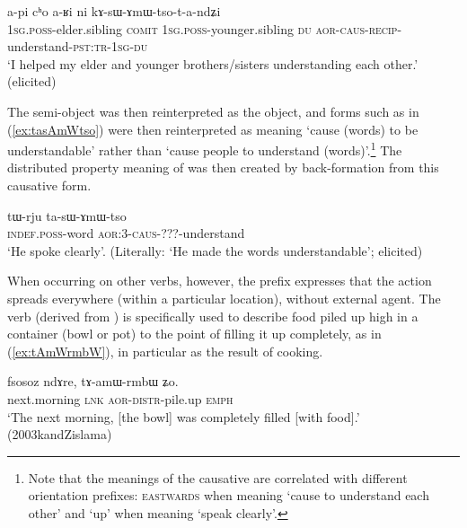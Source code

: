 \begin{exe}
\ex \label{ex:kAsAmWtsotandZi}
 \gll a-pi cʰo a-ʁi ni kɤ-sɯ-ɤmɯ-tso-t-a-ndʑi  \\
\textsc{1sg}.\textsc{poss}-elder.sibling \textsc{comit} \textsc{1sg}.\textsc{poss}-younger.sibling \textsc{du} \textsc{aor}-\textsc{caus}-\textsc{recip}-understand-\textsc{pst}:\textsc{tr}-\textsc{1sg}-\textsc{du} \\
\glt `I helped my elder and younger brothers/sisters understanding each other.' (elicited)
\end{exe}

The semi-object was then reinterpreted as the object, and forms such as  in (\ref{ex:tasAmWtso}) were then reinterpreted as meaning `cause (words) to be understandable' rather than `cause people to understand (words)'.\footnote{Note that the meanings of the causative  are correlated with different orientation prefixes: \textsc{eastwards} when meaning `cause to understand each other' and `up' when meaning `speak clearly'. } The distributed property meaning of  was then created by back-formation from this causative form.

\begin{exe}
\ex \label{ex:tasAmWtso}
 \gll tɯ-rju ta-sɯ-ɤmɯ-tso \\
 \textsc{indef}.\textsc{poss}-word \textsc{aor}:3\flobv{}-\textsc{caus}-???-understand \\
 \glt `He spoke clearly'. (Literally: `He made the words understandable'; elicited)
 \end{exe}

When occurring on other verbs, however, the  prefix expresses that the action spreads everywhere (within a particular location), without external agent. The verb  (derived from ) is specifically used to describe food piled up high in a container (bowl or pot) to the point of filling it up completely, as in (\ref{ex:tAmWrmbW}), in particular as the result of cooking.
 
 \begin{exe}
\ex \label{ex:tAmWrmbW}
 \gll fsosoz ndɤre, tɤ-amɯ-rmbɯ ʑo. \\
 next.morning \textsc{lnk} \textsc{aor}-\textsc{distr}-pile.up \textsc{emph} \\
\glt `The next morning, [the bowl] was completely filled [with food].' (2003kandZislama)
 \end{exe}

